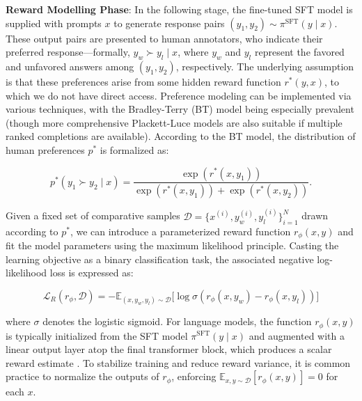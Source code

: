 \textbf{Reward Modelling Phase}: In the following stage, the fine-tuned SFT model is supplied with prompts $x$ to generate response pairs $(y_1, y_2)\sim \pi^\text{SFT}(y \mid x)$. These output pairs are presented to human annotators, who indicate their preferred response—formally, $y_w\succ y_l \mid x$, where $y_w$ and $y_l$ represent the favored and unfavored answers among $(y_1, y_2)$, respectively. The underlying assumption is that these preferences arise from some hidden reward function $r^*(y, x)$, to which we do not have direct access. Preference modeling can be implemented via various techniques, with the Bradley-Terry (BT) \cite{bradley1952rankanalysis} model being especially prevalent (though more comprehensive Plackett-Luce models \citep{plackett1975analysis, luce2012individual} are also suitable if multiple ranked completions are available). According to the BT model, the distribution of human preferences $p^*$ is formalized as:

\begin{equation}\label{eq:bradley-terry}
    p^*(y_1\succ y_2 \mid x)=\frac{\exp\left(r^*(x, y_1)\right)}{\exp\left(r^*(x, y_1)\right) + \exp\left(r^*(x, y_2)\right)}.
\end{equation}

Given a fixed set of comparative samples $\mathcal{D}=\bigl\{x^{(i)}, y_w^{(i)}, y_l^{(i)}\bigr\}_{i=1}^N$ drawn according to $p^*$, we can introduce a parameterized reward function $r_{\phi}(x, y)$ and fit the model parameters using the maximum likelihood principle. Casting the learning objective as a binary classification task, the associated negative log-likelihood loss is expressed as:

\begin{equation}\label{eq:reward_model}
    \mathcal{L}_R(r_{\phi}, \mathcal{D}) = -\mathbb{E}_{(x, y_w, y_l)\sim \mathcal{D}}\bigl[\log \sigma(r_{\phi}(x, y_w)- r_{\phi}(x, y_l))\bigr]
\end{equation}

where $\sigma$ denotes the logistic sigmoid. For language models, the function $r_{\phi}(x, y)$ is typically initialized from the SFT model $\pi^\text{SFT}(y \mid x)$ and augmented with a linear output layer atop the final transformer block, which produces a scalar reward estimate \cite{ziegler2020finetuning}. To stabilize training and reduce reward variance, it is common practice to normalize the outputs of $r_\phi$, enforcing $\mathbb{E}_{x,y\sim \mathcal{D}}\left[r_\phi(x, y)\right] = 0$ for each $x$.

